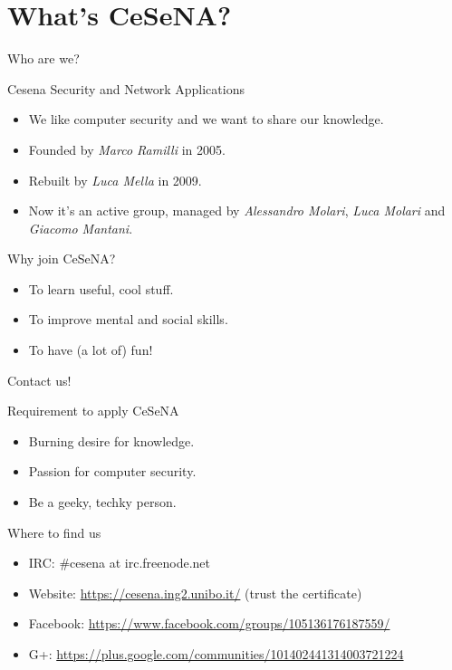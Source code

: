 \section{What's CeSeNA?}

\begin{frame}{Who are we?}

\begin{block}{Cesena Security and Network Applications}
  \begin{itemize}
    \item We like computer security and we want to share our knowledge.
    \item Founded by \emph{Marco Ramilli} in 2005.
    \item Rebuilt by \emph{Luca Mella} in 2009.
    \item Now it's an active group, managed by \emph{Alessandro Molari}, \emph{Luca
      Molari} and \emph{Giacomo Mantani}.
  \end{itemize}
\end{block}

\begin{block}{Why join CeSeNA?}
  \begin{itemize}
  \item To learn useful, cool stuff.
  \item To improve mental and social skills.
  \item To have (a lot of) fun!
  \end{itemize}
\end{block}
\end{frame}

\begin{frame}{Contact us!}

\begin{block}{Requirement to apply CeSeNA}
  \begin{itemize}
    \item Burning desire for knowledge.
    \item Passion for computer security.
    \item Be a geeky, techky person.
  \end{itemize}
\end{block}

\begin{block}{Where to find us}
  \begin{itemize}
  \item IRC: {\small \#cesena at irc.freenode.net}
  \item Website: {\small \url{https://cesena.ing2.unibo.it/}} (trust the certificate)
  \item Facebook: {\small \url{https://www.facebook.com/groups/105136176187559/} }
  \item G+: {\small \url{https://plus.google.com/communities/101402441314003721224}}
  \end{itemize}
\end{block}

\end{frame}
